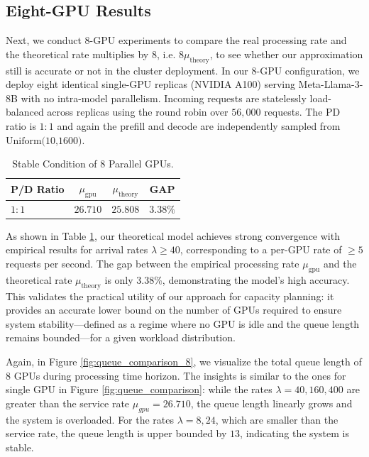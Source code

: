 \documentclass{article}
\theoremstyle{plain}
\theoremstyle{definition}
\theoremstyle{remark}
\begin{document}
\subsection{Eight-GPU Results}
\label{subsec:multi-GPU}
Next, we conduct 8-GPU experiments to compare the real processing rate and the theoretical rate multiplies by $8$, i.e. $8\mu_{\text{theory}}$, to see whether our approximation still is accurate or not in the cluster deployment. In our 8-GPU configuration, we deploy eight identical single-GPU replicas (NVIDIA A100) serving Meta-Llama-3-8B with no intra-model parallelism. Incoming requests are statelessly load-balanced across replicas using the round robin over $56,000$ requests. The PD ratio is $1:1$ and again the prefill and decode are independently sampled from $\text{Uniform(10,1600)}$. 
\begin{table}[h]
\centering
\caption{Stable Condition of 8 Parallel GPUs.}
\label{tab:stable_condition_8}
\begin{tabular}{lccc}
\toprule
\textbf{P/D Ratio} & \textbf{$\mu_{\text{gpu}}$} & \textbf{$\mu_{\text{theory}}$} & \textbf{GAP} \\
\midrule
$1:1$ & $26.710$ & $25.808$ & $3.38\%$ \\
\bottomrule
\end{tabular}
\end{table}

As shown in Table \ref{tab:stable_condition_8}, our theoretical model achieves strong convergence with empirical results for arrival rates $\lambda \geq 40$, corresponding to a per-GPU rate of $\geq 5$ requests per second. The gap between the empirical processing rate $\mu_{\text{gpu}}$ and the theoretical rate $\mu_{\text{theory}}$ is only 3.38\%, demonstrating the model's high accuracy. This validates the practical utility of our approach for capacity planning: it provides an accurate lower bound on the number of GPUs required to ensure system stability—defined as a regime where no GPU is idle and the queue length remains bounded—for a given workload distribution.









Again, in Figure \ref{fig:queue_comparison_8}, we visualize the total queue length of $8$ GPUs during processing time horizon. The insights is similar to the ones for single GPU in Figure \ref{fig:queue_comparison}: while the rates $\lambda=40,160,400$ are greater than the service rate $\mu_{gpu}=26.710$, the queue length linearly grows and the system is overloaded. For the rates $\lambda=8,24$, which are smaller than the service rate, the queue length is upper bounded by $13$, indicating the system is stable.
\end{document}
